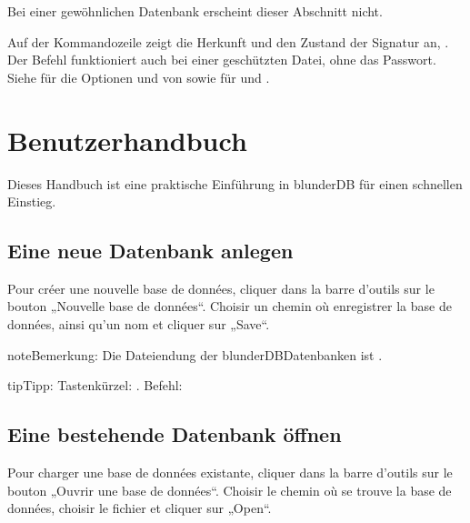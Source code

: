 \documentclass[letterpaper,10pt,german]{sphinxmanual}
\begin{document}
\sphinxAtStartPar
Bei einer gewöhnlichen Datenbank erscheint dieser Abschnitt nicht.

\sphinxAtStartPar
Auf der Kommandozeile zeigt  die Herkunft und den Zustand der Signatur an, . Der Befehl funktioniert auch bei einer geschützten Datei, ohne das Passwort. Siehe  für die Optionen  und  von  sowie für  und .

\sphinxstepscope


\section{Benutzerhandbuch}
\label{\detokenize{guide_utilisateur:guide-utilisateur}}\label{\detokenize{guide_utilisateur:id1}}\label{\detokenize{guide_utilisateur::doc}}
\sphinxAtStartPar
Dieses Handbuch ist eine praktische Einführung in blunderDB für einen schnellen Einstieg.


\subsection{Eine neue Datenbank anlegen}
\label{\detokenize{guide_utilisateur:creer-une-nouvelle-base-de-donnees}}
\sphinxAtStartPar
Pour créer une nouvelle base de données, cliquer dans la barre d’outils sur le
bouton „Nouvelle base de données“. Choisir un chemin où enregistrer la base de
données, ainsi qu’un nom et cliquer sur „Save“.

\begin{sphinxadmonition}{note}{Bemerkung:}
\sphinxAtStartPar
Die Dateiendung der blunderDB\sphinxhyphen{}Datenbanken ist .
\end{sphinxadmonition}

\begin{sphinxadmonition}{tip}{Tipp:}
\sphinxAtStartPar
Tastenkürzel: . Befehl: 
\end{sphinxadmonition}


\subsection{Eine bestehende Datenbank öffnen}
\label{\detokenize{guide_utilisateur:ouvrir-une-base-de-donnee-existante}}
\sphinxAtStartPar
Pour charger une base de données existante, cliquer dans la barre d’outils sur
le bouton „Ouvrir une base de données“. Choisir le chemin où se trouve la base
de données, choisir le fichier  et cliquer sur „Open“.
\end{document}
